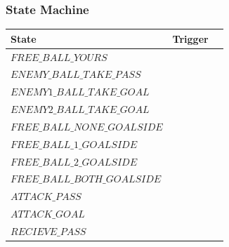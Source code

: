 \documentclass[a4paper,12pt]{article}
\begin{document}
\subsubsection{State Machine}
\begin{tabular}{|l|l|l|}
\hline
State & Trigger &  \\ \hline
$FREE\_BALL\_YOURS$ &  &  \\ \hline
$ENEMY\_BALL\_TAKE\_PASS$ &  &  \\ \hline
$ENEMY1\_BALL\_TAKE\_GOAL$ &  &  \\ \hline
$ENEMY2\_BALL\_TAKE\_GOAL$ &  &  \\ \hline
$FREE\_BALL\_NONE\_GOALSIDE$ &  &  \\ \hline
$FREE\_BALL\_1\_GOALSIDE$ &  &  \\ \hline
$FREE\_BALL\_2\_GOALSIDE$ &  &  \\ \hline
$FREE\_BALL\_BOTH\_GOALSIDE$ &  &  \\ \hline
$ATTACK\_PASS$ &  &  \\ \hline
$ATTACK\_GOAL$ &  &  \\ \hline
$RECIEVE\_PASS$ &  &  \\ \hline
\end{tabular}
\end{document}
